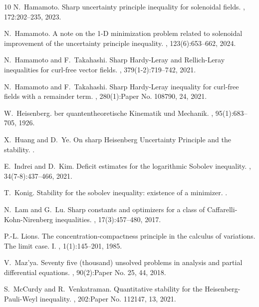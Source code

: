 \documentclass[a4paper,12pt]{article}
\theoremstyle{plain}
\theoremstyle{definition}
\theoremstyle{remark}
\numberwithin{equation}{section}
\begin{document}
\begin{thebibliography}{10}
N.~Hamamoto.
\newblock Sharp uncertainty principle inequality for solenoidal fields.
, 172:202--235, 2023.

N.~Hamamoto.
\newblock A note on the 1-{D} minimization problem related to solenoidal
  improvement of the uncertainty principle inequality.
, 123(6):653--662, 2024.

N.~Hamamoto and F.~Takahashi.
\newblock Sharp {H}ardy-{L}eray and {R}ellich-{L}eray inequalities for
  curl-free vector fields.
, 379(1-2):719--742, 2021.

N.~Hamamoto and F.~Takahashi.
\newblock Sharp {H}ardy-{L}eray inequality for curl-free fields with a
  remainder term.
, 280(1):Paper No. 108790, 24, 2021.

W.~Heisenberg.
ber quantentheoretische {K}inematik und {M}echanik.
, 95(1):683--705, 1926.

X.~Huang and D.~Ye.
\newblock On sharp {H}eisenberg {U}ncertainty {P}rinciple and the stability.
.

E.~Indrei and D.~Kim.
\newblock Deficit estimates for the logarithmic {S}obolev inequality.
, 34(7-8):437--466, 2021.

T.~Konig.
\newblock Stability for the sobolev inequality: existence of a minimizer.
.

N.~Lam and G.~Lu.
\newblock Sharp constants and optimizers for a class of
  {C}affarelli-{K}ohn-{N}irenberg inequalities.
, 17(3):457--480, 2017.

P.-L. Lions.
\newblock The concentration-compactness principle in the calculus of
  variations. {T}he limit case. {I}.
, 1(1):145--201, 1985.

V.~Maz'ya.
\newblock Seventy five (thousand) unsolved problems in analysis and partial
  differential equations.
, 90(2):Paper No. 25, 44,
  2018.

S.~McCurdy and R.~Venkatraman.
\newblock Quantitative stability for the {H}eisenberg-{P}auli-{W}eyl
  inequality.
, 202:Paper No. 112147, 13, 2021.


\end{thebibliography}
\end{document}
